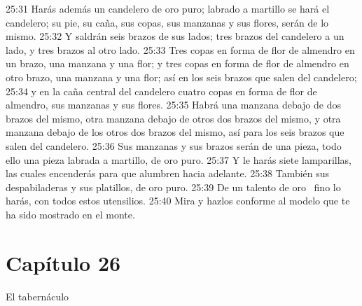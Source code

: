 25:31 Harás además un candelero de oro puro; labrado a martillo se hará el candelero; su pie, su caña, sus copas, sus manzanas y sus flores, serán de lo mismo. 
25:32 Y saldrán seis brazos de sus lados; tres brazos del candelero a un lado, y tres brazos al otro lado. 
25:33 Tres copas en forma de flor de almendro en un brazo, una manzana y una flor; y tres copas en forma de flor de almendro en otro brazo, una manzana y una flor; así en los seis brazos que salen del candelero; 
25:34 y en la caña central del candelero cuatro copas en forma de flor de almendro, sus manzanas y sus flores. 
25:35 Habrá una manzana debajo de dos brazos del mismo, otra manzana debajo de otros dos brazos del mismo, y otra manzana debajo de los otros dos brazos del mismo, así para los seis brazos que salen del candelero. 
25:36 Sus manzanas y sus brazos serán de una pieza, todo ello una pieza labrada a martillo, de oro puro. 
25:37 Y le harás siete lamparillas, las cuales encenderás para que alumbren hacia adelante. 
25:38 También sus despabiladeras y sus platillos, de oro puro. 
25:39 De un talento de oro  fino lo harás, con todos estos utensilios. 
25:40 Mira y hazlos conforme al modelo que te ha sido mostrado en el monte.  
\section*{Capítulo 26}
El tabernáculo 


